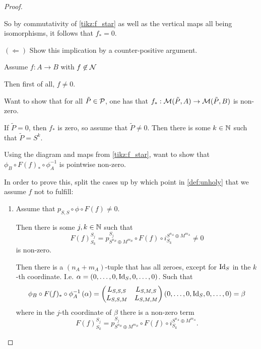 \begin{proof}
\begin{enumerate}
{            So by commutativity of \autoref{tikz:f_star} as well as the vertical maps all being isomorphisms, it follows that \( f_* = 0 \).

            \( ( \Leftarrow ) \) Show this implication by a counter-positive argument.

            Assume \( f: A \to B \) with \( f \not\in {\mathcal{N}} \)

            Then first of all, \( f \neq 0 \).

            Want to show that for all \( \tilde{P} \in {\mathcal{P}} \), one has that \( f_*: {\mathcal{M}}(\tilde{P}, A) \to {\mathcal{M}}(\tilde{P}, B)\) is non-zero.

            If \( \tilde{P} = 0 \), then \( f_* \) is zero, so assume that \( \tilde{P} \neq 0 \). Then there is some \( k \in {\mathbb{N}} \) such that \( \tilde{P} = S^k \).

            Using the diagram and maps from \autoref{tikz:f_star}, want to show that \( \phi_B \circ F(f)_* \circ \phi_A^{-1} \) is pointwise non-zero.

            In order to prove this, split the cases up by which point in \autoref{def:unholy} that we assume \( f \) not to fulfill:
            \begin{enumerate}
                \item {
                    Assume that \( p_{S, S} \circ \phi \circ F(f) \neq 0 \).

                    Then there is some \( j, k \in {\mathbb{N}} \) such that
                    \[
                        F(f)_{S_k}^{S_j} = p_{S^{n_B} \oplus M^{m_B}}^{S_j} \circ F(f) \circ i_{S_k}^{S^{n_A} \oplus M^{m_A}} \neq 0
                    \]
                    is non-zero.

                    Then there is a \( (n_A + m_A) \)-tuple that has all zeroes, except for \( \operatorname{Id}_S \) in the \( k \)-th coordinate. I.e. \( \alpha = \left( 0, \dots, 0, \operatorname{Id}_S, 0, \dots, 0 \right) \). Such that
                    \[
                        \phi_B \circ F(f)_* \circ \phi_A^{-1} \left( \alpha \right)
                        =
                        \begin{pmatrix}
                            L_{S, S, S} & L_{S, M, S} \\
                            L_{S, S, M} & L_{S, M, M}
                        \end{pmatrix}
                        \left( 0, \dots, 0, \operatorname{Id}_S, 0, \dots, 0 \right)
                        = \beta
                    \]
                    where in the \( j \)-th coordinate of \( \beta \) there is a non-zero term
                    \[
                        F(f)_{S_k}^{S_j} =
                        p_{S^{n_B} \oplus M^{m_B}}^{S_j} \circ F(f) \circ i_{S_k}^{S^{n_A} \oplus M^{m_A}}.
                    \]

}
\end{enumerate}}
\end{enumerate}
\end{proof}
